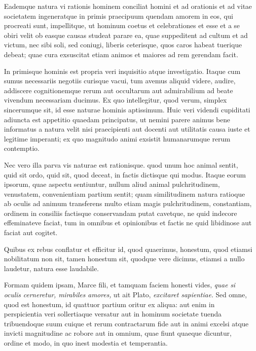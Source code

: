  

 Eademque natura vi rationis hominem conciliat homini et ad orationis et ad vitae societatem ingeneratque in primis praecipuum quendam amorem in eos, qui procreati sunt, impellitque, ut hominum coetus et celebrationes et esse et a se obiri velit ob easque causas studeat parare ea, quae suppeditent ad cultum et ad victum, nec sibi soli, sed coniugi, liberis ceterisque, quos caros habeat tuerique debeat; quae cura exsuscitat etiam animos et maiores ad rem gerendam facit.

 

 In primisque hominis est propria veri inquisitio atque investigatio. Itaque cum sumus necessariis negotiis curisque vacui, tum avemus aliquid videre, audire, addiscere cognitionemque rerum aut occultarum aut admirabilium ad beate vivendum necessariam ducimus. Ex quo intellegitur, quod verum, simplex sincerumque sit, id esse naturae hominis aptissimum. Huic veri videndi cupiditati adiuncta est appetitio quaedam principatus, ut nemini parere animus bene informatus a natura velit nisi praecipienti aut docenti aut utilitatis causa iuste et legitime imperanti; ex quo magnitudo animi exsistit humanarumque rerum contemptio.
 

 Nec vero illa parva vis naturae est rationisque. quod unum hoc animal sentit, quid sit ordo, quid sit, quod deceat, in factis dictisque qui modus. Itaque eorum ipsorum, quae aspectu sentiuntur, nullum aliud animal pulchritudinem, venustatem, convenientiam partium sentit; quam similitudinem natura ratioque ab oculis ad animum transferens multo etiam magis pulchritudinem, constantiam, ordinem in consiliis factisque conservandam putat cavetque, ne quid indecore effeminateve faciat, tum in omnibus et opinionibus et factis ne quid libidinose aut faciat aut cogitet.

Quibus ex rebus conflatur et efficitur id, quod quaerimus, honestum, quod etiamsi nobilitatum non sit, tamen honestum sit, quodque vere dicimus, etiamsi a nullo laudetur, natura esse laudabile.
 

 Formam quidem ipsam, Marce fili, et tamquam faciem honesti vides, \textit{quae si oculis cerneretur, mirabiles amores,} ut ait Plato, \textit{excitaret sapientiae.} Sed omne, quod est honestum, id quattuor partium oritur ex aliqua: aut enim in perspicientia veri sollertiaque versatur aut in hominum societate tuenda tribuendoque suum cuique et rerum contractarum fide aut in animi excelsi atque invicti magnitudine ac robore aut in omnium, quae fiunt quaeque dicuntur, ordine et modo, in quo inest modestia et temperantia.

